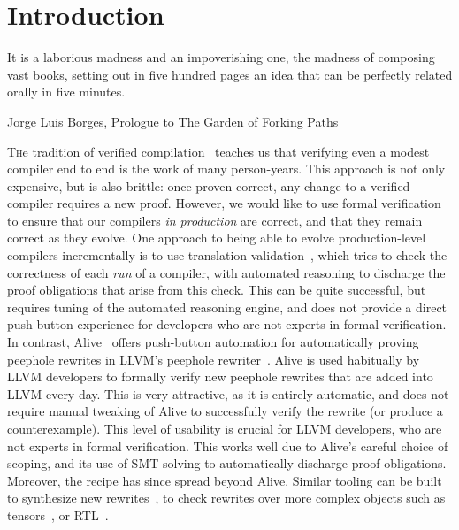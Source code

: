 \chapter{Introduction}
\label{ch:intro}
\epigraph{It is a laborious madness and an impoverishing one, the madness of composing vast books, setting out in five hundred pages an idea that can be perfectly related orally in five minutes.}{Jorge Luis Borges, Prologue to The Garden of Forking Paths}

\lettrine{T}he tradition of verified compilation~\citep{leroy2016compcert,kumar2014cakeml}
teaches us that verifying even a modest compiler end to end is the work of many person-years.
This approach is not only expensive, but is also brittle: once proven correct,
any change to a verified compiler requires a new proof.
However, we would like to use formal verification to ensure that our compilers \emph{in production} are correct,
and that they remain correct as they evolve.
One approach to being able to evolve production-level compilers incrementally
is to use translation validation~\citep{pnueli1998translation}, which tries to check the correctness of each \emph{run} of a compiler,
with automated reasoning to discharge the proof obligations that arise from this check.
This can be quite successful, but requires tuning of the automated reasoning engine,
and does not provide a direct push-button experience for developers who are not experts in formal verification.
In contrast, Alive~\citep{lopes2015provably,lopes2021alive2} offers push-button automation for 
automatically proving peephole rewrites in LLVM's peephole rewriter~\citep{lattner2004llvm}.
Alive is used habitually by LLVM developers to formally verify new peephole rewrites that are added into LLVM every day.
This is very attractive, as it is entirely automatic,
and does not require manual tweaking of Alive to successfully verify the rewrite (or produce a counterexample).
This level of usability is crucial for LLVM developers, who are not experts in formal verification.
This works well due to Alive's careful choice of scoping, and its use of SMT solving to automatically discharge proof obligations.
Moreover, the recipe has since spread beyond Alive. Similar tooling can be built to synthesize new rewrites~\citep{hydra},
to check rewrites over more complex objects such as tensors~\citep{arora2025tensorright}, or RTL~\citep{DBLP:journals/tcad/CowardDC24}.


